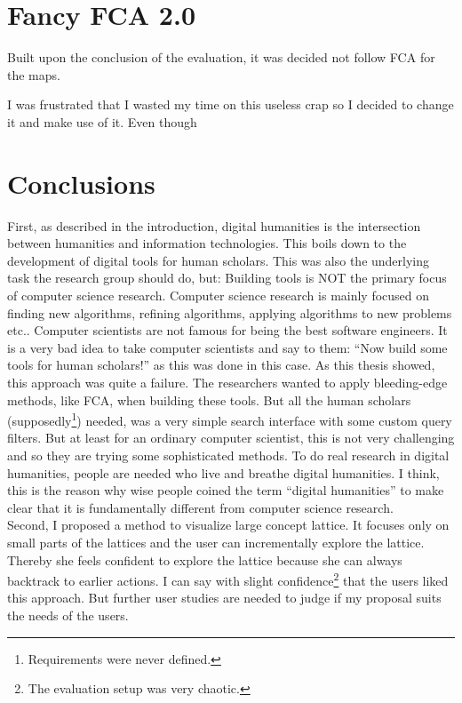 \documentclass[11pt]{report}
\begin{document}
\chapter{Fancy FCA 2.0}
\label{Fancy 2.0}

Built upon the conclusion of the evaluation, it was decided not follow FCA for the maps. 

I was frustrated that I wasted my time on this useless crap so I decided to change it and make use of it. Even though

\chapter{Conclusions}
\label{Conclusions}

First, as described in the introduction, digital humanities is the intersection between humanities and information technologies. This boils down to the development of digital tools for human scholars. This was also the underlying task the research group should do, but: Building tools is NOT the primary focus of computer science research. Computer science research is mainly focused on finding new algorithms, refining algorithms, applying algorithms to new problems etc.. Computer scientists are not famous for being the best software engineers. It is a very bad idea to take computer scientists and say to them: ``Now build some tools for human scholars!'' as this was done in this case. As this thesis showed, this approach was quite a failure. The researchers wanted to apply bleeding-edge methods, like FCA, when building these tools. But all the human scholars (supposedly\footnote{Requirements were never defined.}) needed, was a very simple search interface with some custom query filters. But at least for an ordinary computer scientist, this is not very challenging and so they are trying some sophisticated methods. To do real research in digital humanities, people are needed who live and breathe digital humanities. I think, this is the reason why wise people coined the term ``digital humanities'' to make clear that it is fundamentally different from computer science research. \\

Second, I proposed a method to visualize large concept lattice. It focuses only on small parts of the lattices and the user can incrementally explore the lattice. Thereby she feels confident to explore the lattice because she can always backtrack to earlier actions. I can say with slight confidence\footnote{The evaluation setup was very chaotic.} that the users liked this approach. But further user studies are needed to judge if my proposal suits the needs of the users. \\
\end{document}
